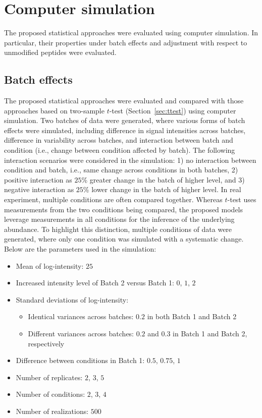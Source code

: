 \documentclass{mcp}
\def\secref#1{Section~\ref{#1}}
\begin{document}
\section{Computer simulation}
\label{sec:sim}

The proposed statistical approaches were evaluated using computer simulation. In particular, their properties under batch effects and adjustment with respect to unmodified peptides were evaluated. 


\subsection{Batch effects}

The proposed statistical approaches were evaluated and compared with those approaches based on two-sample $t$-test (\secref{sec:ttest}) using computer simulation. Two batches of data were generated, where various forms of batch effects were simulated, including difference in signal intensities across batches, difference in variability across batches, and interaction between batch and condition (i.e., change between condition affected by batch). The following interaction scenarios were considered in the simulation: 1) no interaction between condition and batch, i.e., same change across conditions in both batches, 2) positive interaction as $25$\% greater change in the batch of higher level, and 3) negative interaction as $25$\% lower change in the batch of higher level. In real experiment, multiple conditions are often compared together. Whereas $t$-test uses measurements from the two conditions being compared, the proposed models leverage measurements in all conditions for the inference of the underlying abundance. To highlight this distinction, multiple conditions of data were generated, where only one condition was simulated with a systematic change. Below are the parameters used in the simulation: 
\begin{itemize}
\item Mean of log-intensity: $25$
\item Increased intensity level of Batch 2 versus Batch 1: $0$, $1$, $2$
\item Standard deviations of log-intensity: 
\begin{itemize}
\item Identical variances across batches: $0.2$ in both Batch 1 and Batch 2
\item Different variances across batches: $0.2$ and $0.3$ in Batch 1 and Batch 2, respectively
\end{itemize}
\item Difference between conditions in Batch 1: $0.5$, $0.75$, $1$
\item Number of replicates: $2$, $3$, $5$
\item Number of conditions: $2$, $3$, $4$
\item Number of realizations: $500$
\end{itemize}
\end{document}
